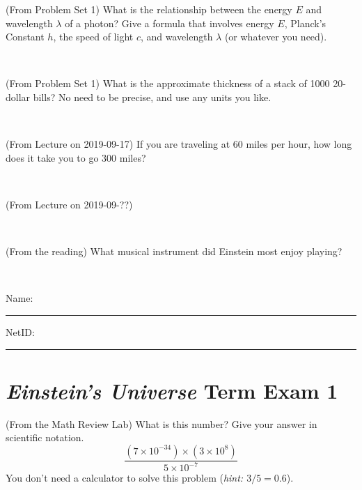 \documentclass[12pt, letterpaper]{article}
\begin{document}
\begin{problem} (From Problem Set 1)
What is the relationship between the energy $E$ and wavelength
$\lambda$ of a photon? Give a formula that involves energy $E$,
Planck's Constant $h$, the speed of light $c$, and wavelength
$\lambda$ (or whatever you need).
\end{problem}

\vfill ~


\clearpage


\begin{problem} (From Problem Set 1)
What is the approximate thickness of a stack of 1000 20-dollar bills?
No need to be precise, and use any units you like.
\end{problem}


\vfill ~

\begin{problem} (From Lecture on 2019-09-17)
If you are traveling at 60 miles per hour, how long does
it take you to go 300 miles?
\end{problem}


\vfill ~

\begin{problem} (From Lecture on 2019-09-??)
\end{problem}


\vfill ~

\begin{problem} (From the reading)
What musical instrument did Einstein most enjoy playing?
\end{problem}


\vfill ~


\cleardoublepage



\noindent
Name: \rule[-1ex]{0.60\textwidth}{0.1pt}
NetID: \rule[-1ex]{0.20\textwidth}{0.1pt}

\section*{\textsl{Einstein's Universe} Term Exam 1}
\setcounter{problem}{1}


\begin{problem} (From the Math Review Lab)
What is this number? Give your answer in scientific notation.
$$
\frac{(7\times10^{-34})\times(3\times10^8)}{5\times10^{-7}}
$$
You don't need a calculator to solve this problem (\textit{hint: $3/5=0.6$}).
\end{problem}


\vfill ~
\end{document}
